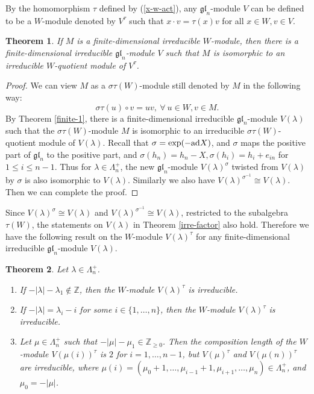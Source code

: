 \documentclass[12pt,a4paper]{amsart}
\newtheorem{theorem}{Theorem}[section]
\numberwithin{equation}{section}
\newcommand{\Z}{\mathbb{Z}}
\def\gl{\mathfrak{gl}}
\def\l{\lambda}
\begin{document}
By the homomorphism $\tau$ defined by (\ref{x-w-act}), any $\gl_n$-module $V$
can be defined to be a $W$-module denoted by $V^\tau$
such that $x\cdot v=\tau(x)v$ for all $x\in W,v\in V$.

\begin{theorem}\label{finite-w-mod}If $M$ is a finite-dimensional  irreducible $W$-module, then there is a finite-dimensional
irreducible $\gl_n$-module $V$ such that $M$ is isomorphic to an irreducible $W$-quotient module of $V^\tau$.
\end{theorem}

\begin{proof} We can view $M$ as a $\sigma\tau(W)$-module still denoted by $M$ in the following way:
$$\sigma\tau(u) \circ v= u v,\  \forall\  u\in W, v\in M.$$
By Theorem \ref{finite-1}, there is a finite-dimensional irreducible $\gl_n$-module $V(\l)$ such that  the $\sigma\tau(W)$-module $M$ is isomorphic to an irreducible $\sigma\tau(W)$-quotient module
of $V(\l)$.
Recall that $\sigma=\textup{exp}(-\textup{ad} X)$, and $\sigma$ maps the positive part of $\gl_n$  to the positive part, and $\sigma(h_n)=h_n-X, \sigma(h_i)=h_i+e_{in}$ for $1\leq i\leq n-1$. Thus for $\l\in \Lambda_n^+$, the new $\gl_n$-module $V(\l)^\sigma$ twisted
from $V(\l)$  by $\sigma$ is also isomorphic to  $V(\l)$. Similarly we also have $V(\l)^{\sigma^{-1}} \cong V(\l)$.
Then we can complete the proof.
\end{proof}

Since $V(\l)^\sigma \cong V(\l)$ and $V(\l)^{\sigma^{-1}} \cong V(\l)$,
restricted  to the subalgebra $\tau(W)$, the statements on $V(\l)$ in Theorem \ref{irre-factor} also hold. Therefore we have the following result on the
$W$-module $V(\l)^\tau$ for any finite-dimensional
irreducible $\gl_n$-module $V(\l)$.

\begin{theorem}\label{irre-factor2}  Let $\l\in \Lambda_n^+$.
\begin{enumerate}
\item If $-|\l|-\l_1\not\in \Z$, then the $W$-module $V(\l)^\tau$ is irreducible.
\item  If $-|\l|=\l_i-i$ for some $i\in\{1,\dots,n\}$, then the $W$-module $V(\l)^\tau$ is irreducible.
\item Let $\mu\in \Lambda_n^+$ such that $-|\mu|-\mu_1\in \Z_{\geq 0}$.
 Then the composition length of the $W$-module $V(\mu(i))^\tau$ is $2$ for $i=1,\dots,n-1$, but $V(\mu)^\tau$  and $V(\mu(n))^\tau$ are irreducible, where $\mu(i)=(\mu_0+1,\dots,\mu_{i-1}+1,\mu_{i+1},\dots,\mu_n)\in \Lambda_n^+$, and $\mu_0=-|\mu|$.
\end{enumerate}
\end{theorem}
\end{document}
